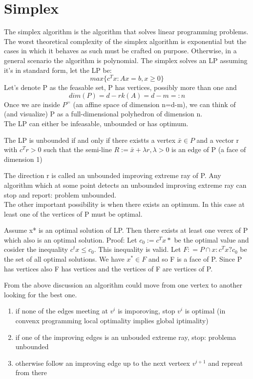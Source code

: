 \section{Simplex}
The simplex algorithm is the algorithm that solves linear programming problems. The worst theoretical complexity of the simplex algorithm is exponential but the cases in which it behaves as such must be crafted on purpose. Otherwise, in a general scenario the algorithm is polynomial.
The simplex solves an LP assuming it's in standard form, let the LP be:
\[ 
    max\{c^Tx: Ax = b, x\geq 0\} 
\]
Let's denote P as the feasable set, P has vertices, possibly more than one and \[ 
    dim(P) = d - rk(A) = d-m =: n 
\]
Once we are inside $ P^= $ (an affine space of dimension n=d-m), we can think of (and visualize) P as a full-dimensional polyhedron of dimension n.\\
The LP can either be infeasable, unbounded or has optimum.
\begin{theorem}
    The LP is unbounded if and only if there existts a vertex $ \bar{x} \in P $  and a vector r with $c^Tr>0$ such that the semi-line $ R:={\bar{x}+\lambda r, \lambda >0} $ is an edge of P (a face of dimension 1) 
\end{theorem}
 The direction r is called an unbounded improving extreme ray of P. Any algorithm which at some point detects an unbounded improving extreme ray can stop and report: problem unbounded.\\ The other important possibility is when there exists an optimum. In this case at least one of the vertices of P must be optimal.
 \begin{theorem}
    Assume x* is an optimal solution of LP. Then there exists at least one verex of P which also is an optimal solution.
    Proof:
    Let $ c_0 := c^Tx*$ be the optimal value and cosider the inequality $ c^tx\leq c_0  $. This inequality is valid. Let $ F : = P \cap {x:c^Tx ? c_0} $ be the set of all optimal solutions. We have $ x^* \in F $ and so F is a face of P. Since P has vertices also F has vertices and the vertices of F are vertices of P. 
 \end{theorem}
 From the above discussion an algorithm could move from one vertex to another looking for the best one.
 \begin{enumerate}
    \item if none of the edges meeting at $v^{i}$ is imporoving, stop $v^i$ is optimal (in convenx programming local optimality implies global iptimality)
    \item if one of the improving edges is an unbouded extreme ray, stop: problema unbounded
    \item otherwise follow an improving edge up to the next verteex $v^{i+1}$ and repreat from there
 \end{enumerate}
